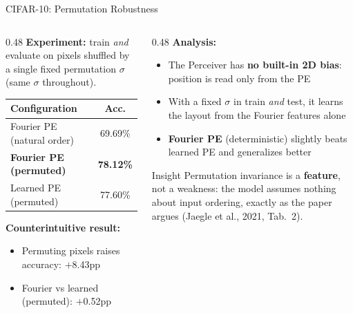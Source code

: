 \documentclass[aspectratio=169,11pt]{beamer}
\begin{document}
\begin{frame}[shrink=5]{CIFAR-10: Permutation Robustness}
  \begin{columns}[T]
    \begin{column}{0.48\textwidth}
      \textbf{Experiment:} train \emph{and} evaluate on pixels shuffled by a single fixed permutation $\sigma$ (same $\sigma$ throughout).

      \vspace{0.5em}
      \begin{table}
        \centering\small
        \begin{tabular}{lc}
          \toprule
          \textbf{Configuration} & \textbf{Acc.} \\
          \midrule
          Fourier PE (natural order) & 69.69\% \\
          \textbf{Fourier PE (permuted)} & \textbf{78.12\%} \\
          Learned PE (permuted) & 77.60\% \\
          \bottomrule
        \end{tabular}
      \end{table}

      \vspace{0.3em}
      \textbf{Counterintuitive result:}
      \begin{itemize}
        \item Permuting pixels \alert{raises} accuracy: $+$8.43pp
        \item Fourier vs learned (permuted): $+$0.52pp
      \end{itemize}
    \end{column}
    \begin{column}{0.48\textwidth}
      \textbf{Analysis:}
      \begin{itemize}
        \item The Perceiver has \textbf{no built-in 2D bias}: position is read only from the PE
        \item With a fixed $\sigma$ in train \emph{and} test, it learns the layout from the Fourier features alone
        \item \textbf{Fourier PE} (deterministic) slightly beats learned PE and generalizes better
      \end{itemize}

      \vspace{0.5em}
      \begin{alertblock}{Insight}
        Permutation invariance is a \textbf{feature}, not a weakness: the model assumes nothing about input ordering, exactly as the paper argues (Jaegle et al., 2021, Tab.~2).
      \end{alertblock}
    \end{column}
  \end{columns}
\end{frame}
\end{document}
